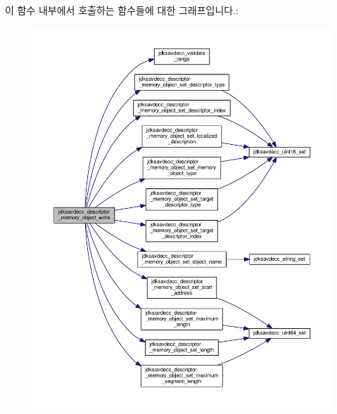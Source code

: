 이 함수 내부에서 호출하는 함수들에 대한 그래프입니다.\+:
\nopagebreak
\begin{figure}[H]
\begin{center}
\leavevmode
\includegraphics[width=350pt]{group__descriptor__memory__object_ga3bfd287144ec5c1b52fce402f2c8aa9e_cgraph}
\end{center}
\end{figure}


